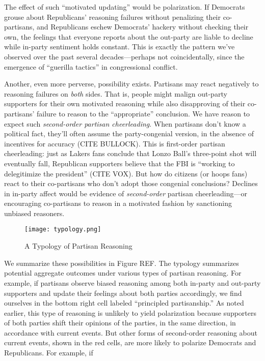 \documentclass[12pt, letterpaper]{article}
\begin{document}
The effect of such ``motivated updating'' would be polarization. If Democrats grouse about Republicans' reasoning failures without penalizing their co-partisans, and Republicans eschew Democrats' hackery without checking their own, the feelings that everyone reports about the out-party are liable to decline while in-party sentiment holds constant. This is exactly the pattern we've observed over the past several decades---perhaps not coincidentally, since the emergence of ``guerilla tactics'' \citep{Schickler2001} in congressional conflict.

Another, even more perverse, possibility exists. Partisans may react negatively to reasoning failures on \emph{both} sides. That is, people might malign out-party supporters for their own motivated reasoning while also disapproving of their co-partisans' failure to reason to the ``appropriate'' conclusion. We have reason to expect such \emph{second-order partisan cheerleading}. When partisans don't know a political fact, they'll often assume the party-congenial version, in the absence of incentives for accuracy (CITE BULLOCK). This is first-order partisan cheerleading: just as Lakers fans conclude that Lonzo Ball's three-point shot will eventually fall, Republican supporters believe that the FBI is ``working to delegitimize the president'' (CITE VOX). But how do citizens (or hoops fans) react to their co-partisans who don't adopt those congenial conclusions? Declines in in-party affect would be evidence of \emph{second-order} partisan cheerleading---or encouraging co-partisans to reason in a motivated fashion by sanctioning unbiased reasoners. 

\begin{figure}
\caption{A Typology of Partisan Reasoning}
\begin{center}
\texttt{[image: typology.png]}
\end{center}
\end{figure}

We summarize these possibilities in Figure REF. The typology summarizes potential aggregate outcomes under various types of partisan reasoning. For example, if partisans observe biased reasoning among both in-party and out-party supporters and update their feelings about both parties accordingly, we find ourselves in the bottom right cell labeled ``principled partisanship.'' As noted earlier, this type of reasoning is unlikely to yield polarization because supporters of both parties shift their opinions of the parties, in the same direction, in accordance with current events. But other forms of second-order reasoning about current events, shown in the red cells, are more likely to polarize Democrats and Republicans. For example, if 
\end{document}
